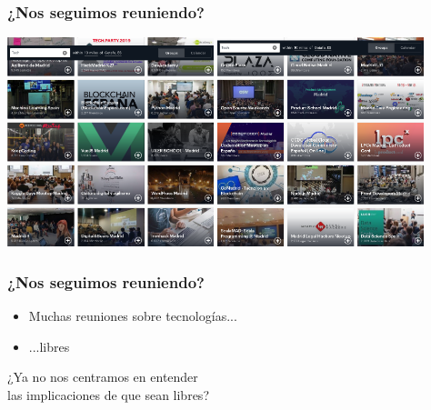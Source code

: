 \documentclass[17pt,aspectratio=169]{beamer}
\begin{document}
\begin{frame}
\frametitle{¿Nos seguimos reuniendo?}

\begin{center}
  \includegraphics[width=6cm]{figs/tech-meetups-1}
  \includegraphics[width=6cm]{figs/tech-meetups-2}
\end{center}  

\end{frame}

\begin{frame}
\frametitle{¿Nos seguimos reuniendo?}

\begin{itemize}
\item Muchas reuniones sobre tecnologías...
\item ...libres
\end{itemize} 

\begin{center}
  ¿Ya no nos centramos en entender \\
  las implicaciones de que sean libres? \\
\end{center}

\end{frame}
\end{document}
